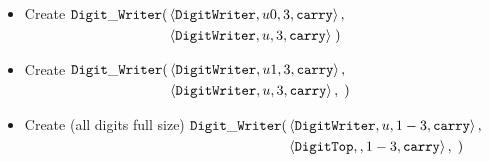 \begin{itemize}
\begin{itemize}
                    \item Create
                    $\begin{aligned}[t]
                        {\tt Digit\_Writer}(& \left\langle {\tt DigitWriter}, u0, 3,  {\tt carry} \right\rangle, \\
                                 & \left\langle {\tt DigitWriter}, u,  3,  {\tt carry} \right\rangle \;)
                    \end{aligned}$

                    \item Create
                    $\begin{aligned}[t]
                        {\tt Digit\_Writer}(& \left\langle {\tt DigitWriter}, u1, 3,  {\tt carry} \right\rangle, \\
                                 & \left\langle {\tt DigitWriter}, u,  3, {\tt carry} \right\rangle, \;)
                    \end{aligned}$

                    \item Create (all digits full size)
                    $\begin{aligned}[t]
                        {\tt Digit\_Writer}(& \left\langle {\tt DigitWriter}, u, 1-3,  {\tt carry} \right\rangle, \\
                                 & \left\langle {\tt DigitTop}, ,  1-3,  {\tt carry} \right\rangle, \;)
                    \end{aligned}$

                \end{itemize}
        \end{itemize}
        \vspace{.5cm}

